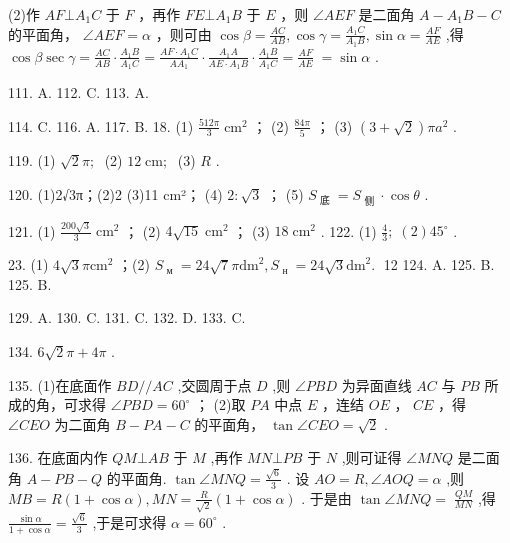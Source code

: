 \documentclass[10pt]{article}
\begin{document}
(2)作 \({AF}\bot {A}_{1}C\) 于 \(F\) ，再作 \({FE}\bot {A}_{1}B\) 于 \(E\) ，则 \(\angle {AEF}\) 是二面角 \(A - {A}_{1}B - C\) 的平面角， \(\angle {AEF} = \alpha\) ，则可由 \(\cos \beta  = \frac{AC}{AB},\cos \gamma  = \frac{{A}_{1}C}{{A}_{1}B},\sin \alpha  = \frac{AF}{AE}\) ,得 \(\cos \beta \sec \gamma  = \frac{AC}{AB} \cdot  \frac{{A}_{1}B}{{A}_{1}C} = \frac{{AF} \cdot  {A}_{1}C}{A{A}_{1}} \cdot  \frac{{A}_{1}A}{{AE} \cdot  {A}_{1}B} \cdot  \frac{{A}_{1}B}{{A}_{1}C} = \frac{AF}{AE} \; = \sin \alpha\) .

111. A. 112. C. 113. A.

114. C. 116. A. 117. B. 18. (1) \(\frac{512\pi }{3}{\mathrm{\;{cm}}}^{2}\) ； (2) \(\frac{84\pi }{5}\) ； (3) \(\left( {3 + \sqrt{2}}\right) \pi {a}^{2}\) .

119. (1) \(\sqrt{2}\pi ;\;\) (2) \({12}\mathrm{\;{cm}};\;\) (3) \(R\) .

120. (1)2√3π；(2)2 (3)11 cm²； (4) \(2 : \sqrt{3}\) ； (5) \({S}_{\text{ 底 }} = {S}_{\text{ 侧 }} \cdot  \cos \theta\) .

121. (1) \(\frac{{200}\sqrt{3}}{3}{\mathrm{\;{cm}}}^{2}\) ； (2) \(4\sqrt{15}{\mathrm{\;{cm}}}^{2}\) ； (3) \({18}{\mathrm{\;{cm}}}^{2}\) . 122. (1) \(\frac{4}{3};\;\left( 2\right) {45}^{ \circ  }\) .

23. (1) \(4\sqrt{3}\pi {\mathrm{{cm}}}^{2}\) ；(2) \({S}_{\text{ м }} = {24}\sqrt{7}\pi {\mathrm{{dm}}}^{2},{S}_{\text{ н }} = {24}\sqrt{3}{\mathrm{{dm}}}^{2}.\;\) 12 124. A. 125. B. 125. B.

129. A. 130. C. 131. C. 132. D. 133. C.

134. \(6\sqrt{2}\pi  + {4\pi }\) .

135. (1)在底面作 \({BD}//{AC}\) ,交圆周于点 \(D\) ,则 \(\angle {PBD}\) 为异面直线 \({AC}\) 与 \({PB}\) 所成的角，可求得 \(\angle {PBD} = {60}^{ \circ  }\) ； (2)取 \({PA}\) 中点 \(E\) ，连结 \({OE}\) ， \({CE}\) ，得 \(\angle {CEO}\) 为二面角 \(B - {PA} - C\) 的平面角， \(\tan \angle {CEO} = \sqrt{2}\) .

136. 在底面内作 \({QM} \bot  {AB}\) 于 \(M\) ,再作 \({MN} \bot  {PB}\) 于 \(N\) ,则可证得 \(\angle {MNQ}\) 是二面角 \(A - {PB} - Q\) 的平面角. \(\tan \angle {MNQ} = \frac{\sqrt{6}}{3}\) . 设 \({AO} = R,\angle {AOQ} = \alpha\) ,则 \({MB} = R\left( {1 + \cos \alpha }\right) ,{MN} = \frac{R}{\sqrt{2}}\left( {1 + \cos \alpha }\right)\) . 于是由 \(\tan \angle {MNQ} = \; \frac{QM}{MN}\) ,得 \(\frac{\sin \alpha }{1 + \cos \alpha } = \frac{\sqrt{6}}{3}\) ,于是可求得 \(\alpha  = {60}^{ \circ  }\) .
\end{document}
